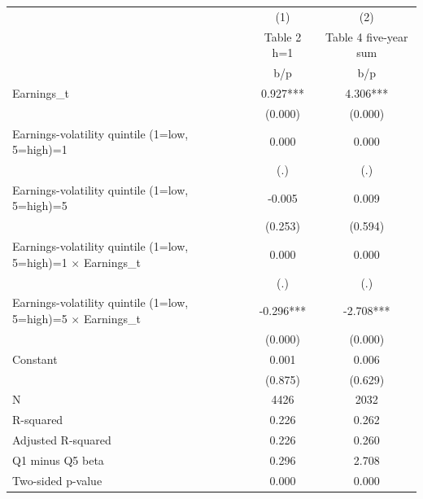 {
\def\sym#1{\ifmmode^{#1}\else\(^{#1}\)\fi}
\begin{tabular}{l*{2}{c}}
\hline\hline
                    &\multicolumn{1}{c}{(1)}&\multicolumn{1}{c}{(2)}\\
                    &\multicolumn{1}{c}{Table 2 h=1}&\multicolumn{1}{c}{Table 4 five-year sum}\\
                    &         b/p   &         b/p   \\
\hline
Earnings\_t          &       0.927***&       4.306***\\
                    &     (0.000)   &     (0.000)   \\
Earnings-volatility quintile (1=low, 5=high)=1&       0.000   &       0.000   \\
                    &         (.)   &         (.)   \\
Earnings-volatility quintile (1=low, 5=high)=5&      -0.005   &       0.009   \\
                    &     (0.253)   &     (0.594)   \\
Earnings-volatility quintile (1=low, 5=high)=1 $\times$ Earnings\_t&       0.000   &       0.000   \\
                    &         (.)   &         (.)   \\
Earnings-volatility quintile (1=low, 5=high)=5 $\times$ Earnings\_t&      -0.296***&      -2.708***\\
                    &     (0.000)   &     (0.000)   \\
Constant            &       0.001   &       0.006   \\
                    &     (0.875)   &     (0.629)   \\
\hline
N                   &        4426   &        2032   \\
R-squared           &       0.226   &       0.262   \\
Adjusted R-squared  &       0.226   &       0.260   \\
Q1 minus Q5 beta    &       0.296   &       2.708   \\
Two-sided p-value   &       0.000   &       0.000   \\
\hline\hline
\end{tabular}
}
